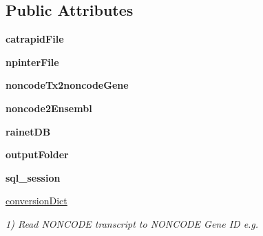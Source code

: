 \subsection*{Public Attributes}
\begin{DoxyCompactItemize}
\item 
\hypertarget{classNPInterPredictionValidation__variant_1_1NPInterPredictionValidation_a13a903d003933e468791546d78b8a317}{{\bfseries catrapid\-File}}\label{classNPInterPredictionValidation__variant_1_1NPInterPredictionValidation_a13a903d003933e468791546d78b8a317}

\item 
\hypertarget{classNPInterPredictionValidation__variant_1_1NPInterPredictionValidation_ab527c1eeb228a257531b73a502ed7bfa}{{\bfseries npinter\-File}}\label{classNPInterPredictionValidation__variant_1_1NPInterPredictionValidation_ab527c1eeb228a257531b73a502ed7bfa}

\item 
\hypertarget{classNPInterPredictionValidation__variant_1_1NPInterPredictionValidation_a98161dcca065dbd4d9fa64a64a3bf847}{{\bfseries noncode\-Tx2noncode\-Gene}}\label{classNPInterPredictionValidation__variant_1_1NPInterPredictionValidation_a98161dcca065dbd4d9fa64a64a3bf847}

\item 
\hypertarget{classNPInterPredictionValidation__variant_1_1NPInterPredictionValidation_a660e663bb0f13375b3acfe6209ece995}{{\bfseries noncode2\-Ensembl}}\label{classNPInterPredictionValidation__variant_1_1NPInterPredictionValidation_a660e663bb0f13375b3acfe6209ece995}

\item 
\hypertarget{classNPInterPredictionValidation__variant_1_1NPInterPredictionValidation_a4444ed6ac6d7ed0e521f0d5d80b4365c}{{\bfseries rainet\-D\-B}}\label{classNPInterPredictionValidation__variant_1_1NPInterPredictionValidation_a4444ed6ac6d7ed0e521f0d5d80b4365c}

\item 
\hypertarget{classNPInterPredictionValidation__variant_1_1NPInterPredictionValidation_a2a043015da00e4bec7201b849173b506}{{\bfseries output\-Folder}}\label{classNPInterPredictionValidation__variant_1_1NPInterPredictionValidation_a2a043015da00e4bec7201b849173b506}

\item 
\hypertarget{classNPInterPredictionValidation__variant_1_1NPInterPredictionValidation_a98d89ddaa01e7472e402a1088bc8279f}{{\bfseries sql\-\_\-session}}\label{classNPInterPredictionValidation__variant_1_1NPInterPredictionValidation_a98d89ddaa01e7472e402a1088bc8279f}

\item 
\hyperlink{classNPInterPredictionValidation__variant_1_1NPInterPredictionValidation_a3510e05a9821aaac2b60e6cf1cf85657}{conversion\-Dict}
\begin{DoxyCompactList}\small\item\em 1) Read N\-O\-N\-C\-O\-D\-E transcript to N\-O\-N\-C\-O\-D\-E Gene I\-D e.\-g. \end{DoxyCompactList}\end{DoxyCompactItemize}
